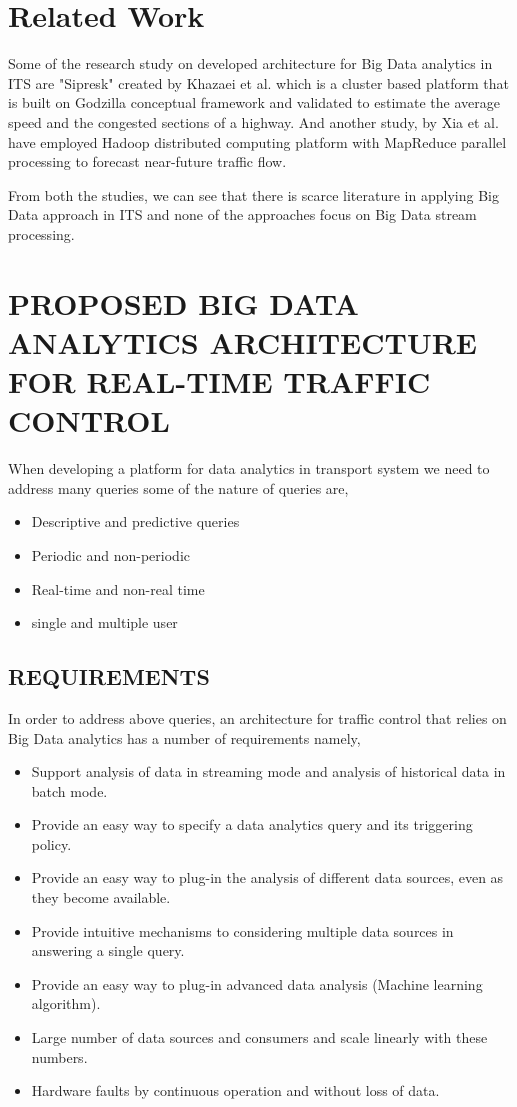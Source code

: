 \documentclass[sigconf]{acmart}
\begin{document}
\section{Related Work}
Some of the research study on developed architecture for Big Data analytics in ITS are "Sipresk" created by Khazaei et al. \cite{Sipresk} which is a cluster based platform that is built on Godzilla conceptual framework \cite{clstr} and validated to estimate the average speed and the congested sections of a highway. And another study, by Xia et al. \cite{mapreduce} have employed Hadoop distributed computing platform with MapReduce parallel processing to forecast near-future traffic flow.

From both the studies, we can see that there is scarce literature in applying Big Data approach in ITS and none of the approaches focus on Big Data stream processing.
    
\section{PROPOSED BIG DATA ANALYTICS ARCHITECTURE FOR
REAL-TIME TRAFFIC CONTROL}
When developing a platform for data analytics in transport system we need to address many queries some of the nature of queries are, 
\begin{itemize}
\item Descriptive and predictive queries
\item Periodic and non-periodic
\item Real-time and non-real time
\item single and multiple user
\end{itemize}
\subsection{REQUIREMENTS}
In order to address above queries, an architecture for traffic control that relies on Big Data analytics has a number of requirements namely,
\begin{itemize}
\item Support analysis of data in streaming mode and analysis of historical data in batch mode.
\item Provide an easy way to specify a data analytics query and its triggering policy.
\item Provide an easy way to plug-in the analysis of different data sources, even as they become available.
\item Provide intuitive mechanisms to considering multiple data sources in answering a single query.
\item Provide an easy way to plug-in advanced data analysis (Machine learning algorithm).
\item Large number of data sources and consumers and scale linearly with these numbers.
\item Hardware faults by continuous operation and without loss of data.
\end{itemize}
\end{document}
